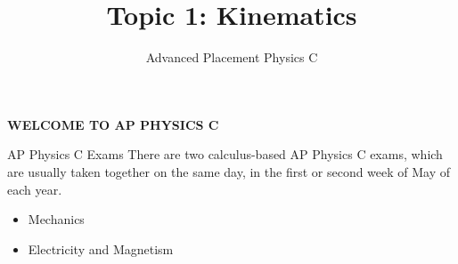 \documentclass[12pt,compress,aspectratio=169]{beamer}
\title{Topic 1: Kinematics}
\subtitle{Advanced Placement Physics C}
\begin{document}
\begin{frame}{}

  {\LARGE
    \begin{center}
      \textbf{WELCOME TO AP PHYSICS C}
    \end{center}
  }
\end{frame}






\begin{frame}{AP Physics C Exams}
  There are two calculus-based AP Physics C exams, which are usually taken
  together on the same day, in the first or second week of May of each year.
  \begin{itemize}
  \item Mechanics
  \item Electricity and Magnetism
  \end{itemize}
\end{frame}



\begin{frame}
  \titlepage
\end{frame}
\end{document}
